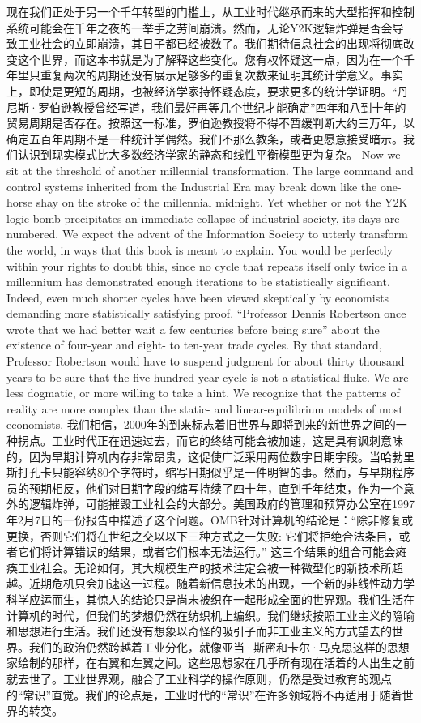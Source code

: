 \begin{paracol}{2}
\switchcolumn*
现在我们正处于另一个千年转型的门槛上，从工业时代继承而来的大型指挥和控制系统可能会在千年之夜的一举手之劳间崩溃。然而，无论Y2K逻辑炸弹是否会导致工业社会的立即崩溃，其日子都已经被数了。我们期待信息社会的出现将彻底改变这个世界，而这本书就是为了解释这些变化。您有权怀疑这一点，因为在一个千年里只重复两次的周期还没有展示足够多的重复次数来证明其统计学意义。事实上，即使是更短的周期，也被经济学家持怀疑态度，要求更多的统计学证明。“丹尼斯·罗伯逊教授曾经写道，我们最好再等几个世纪才能确定”四年和八到十年的贸易周期是否存在。按照这一标准，罗伯逊教授将不得不暂缓判断大约三万年，以确定五百年周期不是一种统计学偶然。我们不那么教条，或者更愿意接受暗示。我们认识到现实模式比大多数经济学家的静态和线性平衡模型更为复杂。
\switchcolumn
Now we sit at the threshold of another millennial transformation. The large command and control systems inherited from the Industrial Era may break down like the one-horse shay on the stroke of the millennial midnight. Yet whether or not the Y2K logic bomb precipitates an immediate collapse of industrial society, its days are numbered. We expect the advent of the Information Society to utterly transform the world, in ways that this book is meant to explain. You would be perfectly within your rights to doubt this, since no cycle that repeats itself only twice in a millennium has demonstrated enough iterations to be statistically significant. Indeed, even much shorter cycles have been viewed skeptically by economists demanding more statistically satisfying proof. ``Professor Dennis Robertson once wrote that we had better wait a few centuries before being sure'' about the existence of four-year and eight- to ten-year trade cycles. By that standard, Professor Robertson would have to suspend judgment for about thirty thousand years to be sure that the five-hundred-year cycle is not a statistical fluke. We are less dogmatic, or more willing to take a hint. We recognize that the patterns of reality are more complex than the static- and linear-equilibrium models of most economists.
\switchcolumn*
我们相信，2000年的到来标志着旧世界与即将到来的新世界之间的一种拐点。工业时代正在迅速过去，而它的终结可能会被加速，这是具有讽刺意味的，因为早期计算机内存非常昂贵，这促使广泛采用两位数字日期字段。当哈勃里斯打孔卡只能容纳80个字符时，缩写日期似乎是一件明智的事。然而，与早期程序员的预期相反，他们对日期字段的缩写持续了四十年，直到千年结束，作为一个意外的逻辑炸弹，可能摧毁工业社会的大部分。美国政府的管理和预算办公室在1997年2月7日的一份报告中描述了这个问题。OMB针对计算机的结论是：“除非修复或更换，否则它们将在世纪之交以以下三种方式之一失败: 它们将拒绝合法条目，或者它们将计算错误的结果，或者它们根本无法运行。” 这三个结果的组合可能会瘫痪工业社会。无论如何，其大规模生产的技术注定会被一种微型化的新技术所超越。近期危机只会加速这一过程。随着新信息技术的出现，一个新的非线性动力学科学应运而生，其惊人的结论只是尚未被织在一起形成全面的世界观。我们生活在计算机的时代，但我们的梦想仍然在纺织机上编织。我们继续按照工业主义的隐喻和思想进行生活。我们还没有想象以奇怪的吸引子而非工业主义的方式望去的世界。我们的政治仍然跨越着工业分化，就像亚当·斯密和卡尔·马克思这样的思想家绘制的那样，在右翼和左翼之间。这些思想家在几乎所有现在活着的人出生之前就去世了。工业世界观，融合了工业科学的操作原则，仍然是受过教育的观点的“常识”直觉。我们的论点是，工业时代的“常识”在许多领域将不再适用于随着世界的转变。

\end{paracol}

